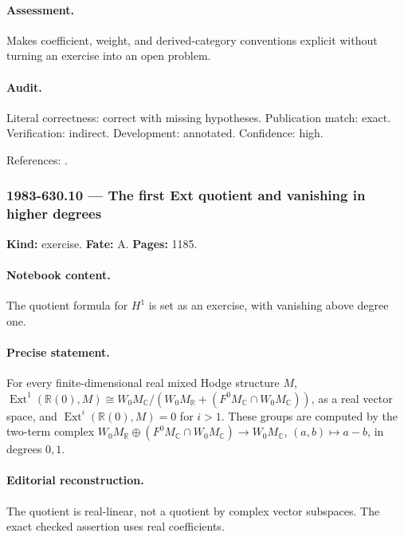\paragraph{Assessment.} Makes coefficient, weight, and derived-category conventions explicit without turning an exercise into an open problem.

\paragraph{Audit.} Literal correctness: correct with missing hypotheses. Publication match: exact. Verification: indirect. Development: annotated. Confidence: high.

\noindent References: \citep{beilinson1986absolute,bunkenikolaustamme2018regulator}.\par

\subsubsection{1983-630.10 --- The first Ext quotient and vanishing in higher degrees}

\label{item:1983-630.10}

\noindent\textbf{Kind:} exercise. \textbf{Fate:} A. \textbf{Pages:} 1185.\par

\paragraph{Notebook content.} The quotient formula for \(H^1\) is set as an exercise, with vanishing above degree one.

\paragraph{Precise statement.} For every finite-dimensional real mixed Hodge structure \(M\), \(\operatorname{Ext}^1(\mathbb R(0),M)\cong W_0M_{\mathbb C}/(W_0M_{\mathbb R}+(F^0M_{\mathbb C}\cap W_0M_{\mathbb C}))\), as a real vector space, and \(\operatorname{Ext}^i(\mathbb R(0),M)=0\) for \(i>1\). These groups are computed by the two-term complex \(W_0M_{\mathbb R}\oplus(F^0M_{\mathbb C}\cap W_0M_{\mathbb C})\to W_0M_{\mathbb C}\), \((a,b)\mapsto a-b\), in degrees \(0,1\).

\paragraph{Editorial reconstruction.} The quotient is real-linear, not a quotient by complex vector subspaces. The exact checked assertion uses real coefficients.


